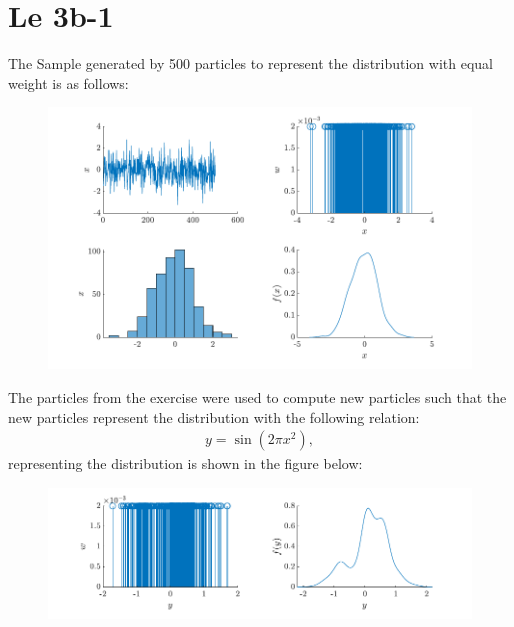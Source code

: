 \section{Le 3b-1}

The Sample generated by 500 particles to represent the distribution with equal weight is as follows:
\begin{figure}[!h]
    \centering
    \includegraphics{figures/ex4_a.pdf}
\end{figure}

\newpage 
The particles from the exercise were used to compute new particles such that the new particles represent the distribution with the following relation:
\begin{align*}
    y = \sin(2\pi x^2),
\end{align*}
representing the distribution is shown in the figure below:
\begin{figure}[!h]
    \centering
    \includegraphics{figures/ex4_b.pdf}
\end{figure}
